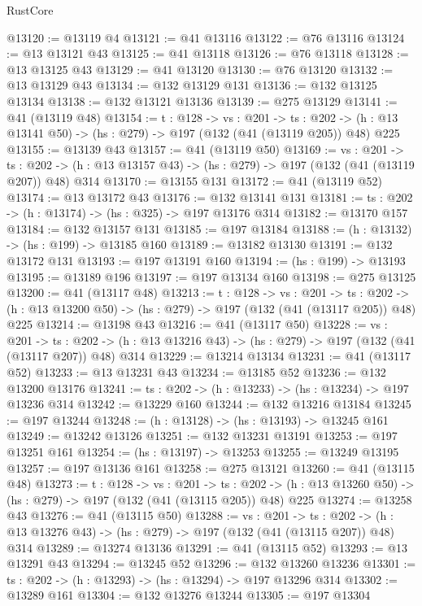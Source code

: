 \begin{lexlean}{RustCore}
\begin{coremodule}
@13120 := @13119 @4
@13121 := @41 @13116
@13122 := @76 @13116
@13124 := @13 @13121 @43
@13125 := @41 @13118
@13126 := @76 @13118
@13128 := @13 @13125 @43
@13129 := @41 @13120
@13130 := @76 @13120
@13132 := @13 @13129 @43
@13134 := @132 @13129 @131
@13136 := @132 @13125 @13134
@13138 := @132 @13121 @13136
@13139 := @275 @13129
@13141 := @41 (@13119 @48)
@13154 := {t : @128} ->
  {vs : @201} ->
  {ts : @202} -> (h : @13 @13141 @50) -> (hs : @279) -> @197 (@132 (@41 (@13119 @205)) @48) @225
@13155 := @13139 @43
@13157 := @41 (@13119 @50)
@13169 := {vs : @201} ->
  {ts : @202} -> (h : @13 @13157 @43) -> (hs : @279) -> @197 (@132 (@41 (@13119 @207)) @48) @314
@13170 := @13155 @131
@13172 := @41 (@13119 @52)
@13174 := @13 @13172 @43
@13176 := @132 @13141 @131
@13181 := {ts : @202} -> (h : @13174) -> (hs : @325) -> @197 @13176 @314
@13182 := @13170 @157
@13184 := @132 @13157 @131
@13185 := @197 @13184
@13188 := (h : @13132) -> (hs : @199) -> @13185 @160
@13189 := @13182 @13130
@13191 := @132 @13172 @131
@13193 := @197 @13191 @160
@13194 := (hs : @199) -> @13193
@13195 := @13189 @196
@13197 := @197 @13134 @160
@13198 := @275 @13125
@13200 := @41 (@13117 @48)
@13213 := {t : @128} ->
  {vs : @201} ->
  {ts : @202} -> (h : @13 @13200 @50) -> (hs : @279) -> @197 (@132 (@41 (@13117 @205)) @48) @225
@13214 := @13198 @43
@13216 := @41 (@13117 @50)
@13228 := {vs : @201} ->
  {ts : @202} -> (h : @13 @13216 @43) -> (hs : @279) -> @197 (@132 (@41 (@13117 @207)) @48) @314
@13229 := @13214 @13134
@13231 := @41 (@13117 @52)
@13233 := @13 @13231 @43
@13234 := @13185 @52
@13236 := @132 @13200 @13176
@13241 := {ts : @202} -> (h : @13233) -> (hs : @13234) -> @197 @13236 @314
@13242 := @13229 @160
@13244 := @132 @13216 @13184
@13245 := @197 @13244
@13248 := (h : @13128) -> (hs : @13193) -> @13245 @161
@13249 := @13242 @13126
@13251 := @132 @13231 @13191
@13253 := @197 @13251 @161
@13254 := (hs : @13197) -> @13253
@13255 := @13249 @13195
@13257 := @197 @13136 @161
@13258 := @275 @13121
@13260 := @41 (@13115 @48)
@13273 := {t : @128} ->
  {vs : @201} ->
  {ts : @202} -> (h : @13 @13260 @50) -> (hs : @279) -> @197 (@132 (@41 (@13115 @205)) @48) @225
@13274 := @13258 @43
@13276 := @41 (@13115 @50)
@13288 := {vs : @201} ->
  {ts : @202} -> (h : @13 @13276 @43) -> (hs : @279) -> @197 (@132 (@41 (@13115 @207)) @48) @314
@13289 := @13274 @13136
@13291 := @41 (@13115 @52)
@13293 := @13 @13291 @43
@13294 := @13245 @52
@13296 := @132 @13260 @13236
@13301 := {ts : @202} -> (h : @13293) -> (hs : @13294) -> @197 @13296 @314
@13302 := @13289 @161
@13304 := @132 @13276 @13244
@13305 := @197 @13304

\end{coremodule}
\end{lexlean}
